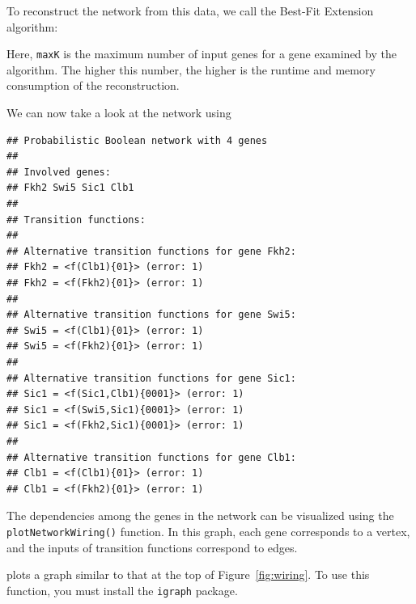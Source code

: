 \documentclass[a4paper]{article}
\begin{document}
To reconstruct the network from this data, we call the Best-Fit Extension algorithm:
\begin{knitrout}
\color{fgcolor}\begin{kframe}
\begin{alltt}
 \hlkwb{<-} \hlopt{$}
                          \hlstd{=}\hlstd{,}
                          \hlstd{=}\hlstd{)}
\end{alltt}
\end{kframe}
\end{knitrout}
Here, \texttt{maxK} is the maximum number of input genes for a gene examined by the algorithm. The higher this number, the higher is the runtime and memory consumption of the reconstruction.

\begin{samepage}
We can now take a look at the network using
\begin{knitrout}
\color{fgcolor}\begin{kframe}
\begin{alltt}
\end{alltt}
\begin{verbatim}
## Probabilistic Boolean network with 4 genes
## 
## Involved genes:
## Fkh2 Swi5 Sic1 Clb1
## 
## Transition functions:
## 
## Alternative transition functions for gene Fkh2:
## Fkh2 = <f(Clb1){01}> (error: 1)
## Fkh2 = <f(Fkh2){01}> (error: 1)
## 
## Alternative transition functions for gene Swi5:
## Swi5 = <f(Clb1){01}> (error: 1)
## Swi5 = <f(Fkh2){01}> (error: 1)
## 
## Alternative transition functions for gene Sic1:
## Sic1 = <f(Sic1,Clb1){0001}> (error: 1)
## Sic1 = <f(Swi5,Sic1){0001}> (error: 1)
## Sic1 = <f(Fkh2,Sic1){0001}> (error: 1)
## 
## Alternative transition functions for gene Clb1:
## Clb1 = <f(Clb1){01}> (error: 1)
## Clb1 = <f(Fkh2){01}> (error: 1)
\end{verbatim}
\end{kframe}
\end{knitrout}
\end{samepage}

\begin{sloppypar}
The dependencies among the genes in the network can be visualized using the \texttt{plotNetworkWiring()} function. In this graph, each gene corresponds to a vertex, and the inputs of transition functions correspond to edges.
\end{sloppypar}
\begin{knitrout}
\color{fgcolor}\begin{kframe}
\begin{alltt}
\end{alltt}
\end{kframe}
\end{knitrout}
plots a graph similar to that at the top of Figure~\ref{fig:wiring}. To use this function, you must install the \texttt{igraph} package.
\end{document}
